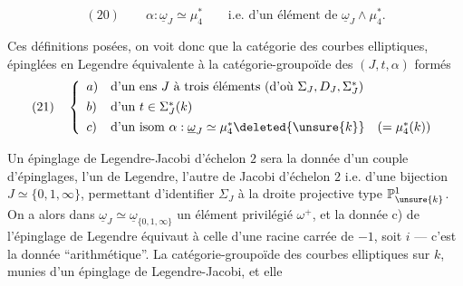 \[
(20)\qquad \alpha:\underline{\omega}_J\simeq\mu_4^*\qquad\text{i.e. d'un élément de }\underline{\omega}_J\wedge\mu_4^*.
\]

Ces définitions posées, on voit donc que la catégorie des courbes elliptiques, épinglées en Legendre  équivalente à la catégorie-groupoïde des  $(J,t,\alpha)$  formés
\[
(21)\quad\left\{\begin{array}{ll}
a)&\text{d'un ens }J\text{ à trois éléments (d'où }\Sigma_J,D_J,\Sigma_J^*\text{)}\\[4pt]
b)&\text{d'un }t\in\Sigma_J^*(k)\\[4pt]
c)&\text{d'un isom }\alpha:\underline{\omega}_J\simeq\mu_4^*\deleted{\unsure{k}}\quad(=\mu_4^*(k))
\end{array}\right.
\]

Un épinglage de Legendre-Jacobi d'échelon $2$  sera la donnée d'un couple d'épinglages, l'un de Legendre, l'autre de Jacobi d'échelon $2$ i.e. d'une bijection $J\simeq\{0,1,\infty\}$, permettant d'identifier $\Sigma_J$ à la droite projective type $\mathbb{P}^1_{\unsure{k}}$. On a alors dans $\underline{\omega}_J\simeq\underline{\omega}_{\{0,1,\infty\}}$ un élément privilégié $\omega^+$, et la donnée c)  de l'épinglage de Legendre équivaut à celle d'une racine carrée  de $-1$, soit $i$ --- c'est la donnée ``arithmétique''.  La catégorie-groupoïde des courbes elliptiques sur $k$, munies d'un épinglage de Legendre-Jacobi,   et elle
